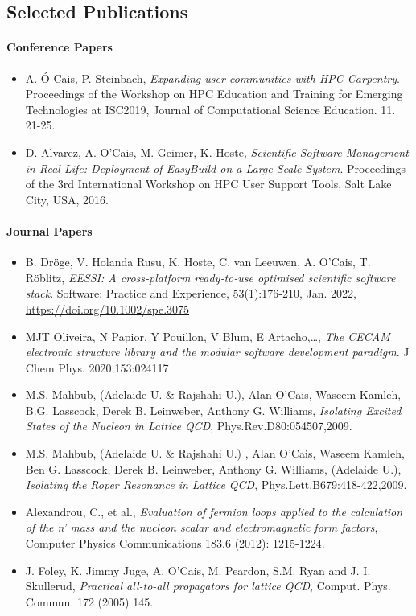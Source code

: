 \subsection*{Selected Publications}

\paragraph{Conference Papers}

\begin{itemize}
\item[] A. \'O Cais, P. Steinbach, \emph{Expanding user communities with HPC Carpentry}. Proceedings of the Workshop on HPC Education and Training for Emerging Technologies at ISC2019, Journal of Computational Science Education. 11. 21-25.
\end{itemize}

\begin{itemize}
\item[] D. Alvarez, A. O'Cais, M. Geimer, K. Hoste, \emph{Scientific Software Management in Real Life: Deployment of EasyBuild on a Large Scale System}. Proceedings of the 3rd International Workshop on HPC User Support Tools, Salt Lake City, USA, 2016.
\end{itemize}

\paragraph{Journal Papers}

\begin{itemize}
\item[] B. Dröge, V. Holanda Rusu, K. Hoste, C. van Leeuwen, A. O'Cais, T. Röblitz, \emph{{EESSI}: {A cross‐platform
    ready‐to‐use optimised scientific software stack}}. Software: Practice and Experience, 53(1):176-210, Jan. 2022,
    \url{https://doi.org/10.1002/spe.3075}
\item[] MJT Oliveira, N Papior, Y Pouillon, V Blum, E Artacho,\dots, \emph{The {CECAM} electronic structure library and the modular software development paradigm}.
  J Chem Phys. 2020;153:024117
\item[] M.S. Mahbub, (Adelaide U. \& Rajshahi U.), Alan O'Cais, Waseem Kamleh, B.G. Lasscock, Derek B. Leinweber, Anthony G. Williams, \emph{Isolating Excited States of the Nucleon in Lattice QCD}, Phys.Rev.D80:054507,2009.
\item[] M.S. Mahbub, (Adelaide U. \& Rajshahi U.) , Alan O'Cais, Waseem Kamleh, Ben G. Lasscock, Derek B. Leinweber, Anthony G. Williams, (Adelaide U.), \emph{Isolating the Roper Resonance in Lattice QCD}, Phys.Lett.B679:418-422,2009.
\item[] Alexandrou, C., et al., \emph{Evaluation of fermion loops applied to the calculation of the n' mass and the nucleon scalar and electromagnetic form factors}, Computer Physics Communications 183.6 (2012): 1215-1224.
\item[] J. Foley, K. Jimmy Juge, A. O'Cais, M. Peardon, S.M. Ryan and J. I. Skullerud, \emph{Practical all-to-all propagators for lattice QCD}, Comput. Phys. Commun. 172 (2005) 145.
\end{itemize}

\newpage
